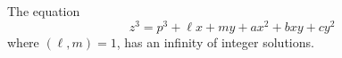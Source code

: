 \begin{proposition}
    The equation
\[
    z^3=p^3+\ell x+my+ax^2+bxy+cy^2
\]
    where $(\ell,m)=1$, has an infinity of integer solutions.
\end{proposition}
